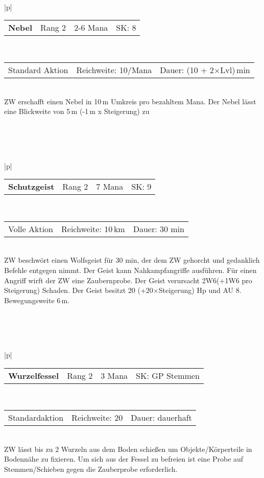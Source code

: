 \documentclass[../../Heldenanleitung2]{subfiles}
\begin{document}
\\\\\\
\begin{tabular}{|p{\textwidth}|}
\hline
\begin{tabularx}{\textwidth}{X|X|X|X}
\textbf{Nebel} & Rang 2 & 2-6 Mana & SK: 8
\end{tabularx} \\ \hline
\begin{tabularx}{\textwidth}{X|X|X}
Standard Aktion & Reichweite: 10/Mana & Dauer: (10 + 2$\times$Lvl)\,min
\end{tabularx} \\ \hline
ZW erschafft einen Nebel in 10\,m Umkreis pro bezahltem Mana. Der Nebel lässt eine Blickweite von 5\,m (-1\,m x Steigerung) zu
\\ \hline
\end{tabular}
\\\\\\
\begin{tabular}{|p{\textwidth}|}
\hline
\begin{tabularx}{\textwidth}{X|X|X|X}
\textbf{Schutzgeist} & Rang 2 & 7 Mana & SK: 9
\end{tabularx} \\ \hline
\begin{tabularx}{\textwidth}{X|X|X}
Volle Aktion & Reichweite: 10\,km & Dauer: 30 min
\end{tabularx} \\ \hline
ZW beschwört einen Wolfsgeist für 30 min, der dem ZW gehorcht und gedanklich Befehle entgegen nimmt. Der Geist kann Nahkampfangriffe ausführen. Für einen Angriff wirft der ZW eine Zaubernprobe. Der Geist verursacht 2W6(+1W6 pro Steigerung) Schaden. Der Geist besitzt 20 (+20$\times$Steigerung) Hp und AU 8. Bewegungsweite 6\,m.
\\ \hline
\end{tabular}
\\\\\\
\begin{tabular}{|p{\textwidth}|}
\hline
\begin{tabularx}{\textwidth}{X|X|X|X}
\textbf{Wurzelfessel} & Rang 2 & 3 Mana & SK: GP Stemmen
\end{tabularx} \\ \hline
\begin{tabularx}{\textwidth}{X|X|X}
Standardaktion & Reichweite: 20 & Dauer: dauerhaft
\end{tabularx} \\ \hline
ZW lässt bis zu 2 Wurzeln aus dem Boden schießen um Objekte/Körperteile in Bodennähe zu fixieren. Um sich aus der Fessel zu befreien ist eine Probe auf Stemmen/Schieben gegen die Zauberprobe erforderlich.
\\ \hline
\end{tabular}
\end{document}
